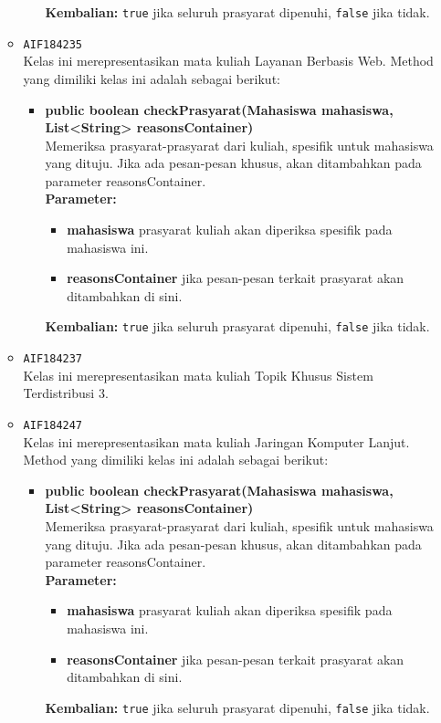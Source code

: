 \begin{enumerate}
\begin{itemize}
\begin{itemize}
\textbf{Kembalian:} \texttt{true} jika seluruh prasyarat dipenuhi, \texttt{false} jika tidak.
\end{itemize}
\item \texttt{AIF184235} \\
Kelas ini merepresentasikan mata kuliah Layanan Berbasis Web. Method yang dimiliki kelas ini adalah sebagai berikut: 
\begin{itemize}
\item \textbf{public boolean checkPrasyarat(Mahasiswa mahasiswa, List<String> reasonsContainer)}\\
Memeriksa prasyarat-prasyarat dari kuliah, spesifik untuk mahasiswa yang dituju. Jika ada pesan-pesan khusus, akan ditambahkan pada parameter reasonsContainer.\\
\textbf{Parameter:}
\begin{itemize}
\item \textbf{mahasiswa} prasyarat kuliah akan diperiksa spesifik pada mahasiswa ini.
\item \textbf{reasonsContainer} jika pesan-pesan terkait prasyarat akan ditambahkan di sini.
\end{itemize}
\textbf{Kembalian:} \texttt{true} jika seluruh prasyarat dipenuhi, \texttt{false} jika tidak.
\end{itemize}
\item \texttt{AIF184237} \\
Kelas ini merepresentasikan mata kuliah Topik Khusus Sistem Terdistribusi 3.
\item \texttt{AIF184247} \\
Kelas ini merepresentasikan mata kuliah Jaringan Komputer Lanjut. Method yang dimiliki kelas ini adalah sebagai berikut: 
\begin{itemize}
\item \textbf{public boolean checkPrasyarat(Mahasiswa mahasiswa, List<String> reasonsContainer)}\\
Memeriksa prasyarat-prasyarat dari kuliah, spesifik untuk mahasiswa yang dituju. Jika ada pesan-pesan khusus, akan ditambahkan pada parameter reasonsContainer.\\
\textbf{Parameter:}
\begin{itemize}
\item \textbf{mahasiswa} prasyarat kuliah akan diperiksa spesifik pada mahasiswa ini.
\item \textbf{reasonsContainer} jika pesan-pesan terkait prasyarat akan ditambahkan di sini.
\end{itemize}
\textbf{Kembalian:} \texttt{true} jika seluruh prasyarat dipenuhi, \texttt{false} jika tidak.

\end{itemize}
\end{itemize}
\end{enumerate}
